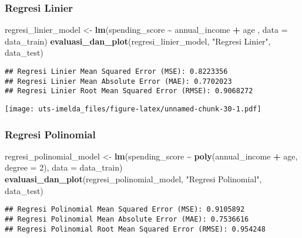 \documentclass[
]{article}
\newenvironment{Shaded}{\begin{snugshade}}{\end{snugshade}}
\newcommand{\AttributeTok}[1]{\textcolor[rgb]{0.13,0.29,0.53}{#1}}
\newcommand{\DecValTok}[1]{\textcolor[rgb]{0.00,0.00,0.81}{#1}}
\newcommand{\FunctionTok}[1]{\textcolor[rgb]{0.13,0.29,0.53}{\textbf{#1}}}
\newcommand{\NormalTok}[1]{#1}
\newcommand{\OtherTok}[1]{\textcolor[rgb]{0.56,0.35,0.01}{#1}}
\newcommand{\SpecialCharTok}[1]{\textcolor[rgb]{0.81,0.36,0.00}{\textbf{#1}}}
\newcommand{\StringTok}[1]{\textcolor[rgb]{0.31,0.60,0.02}{#1}}
\begin{document}
\hypertarget{regresi-linier}{%
\subsubsection{Regresi Linier}\label{regresi-linier}}

\begin{Shaded}
\begin{Highlighting}[]
\NormalTok{regresi\_linier\_model }\OtherTok{\textless{}{-}} \FunctionTok{lm}\NormalTok{(spending\_score }\SpecialCharTok{\textasciitilde{}}\NormalTok{ annual\_income }\SpecialCharTok{+}\NormalTok{ age , }\AttributeTok{data =}\NormalTok{ data\_train)}
\FunctionTok{evaluasi\_dan\_plot}\NormalTok{(regresi\_linier\_model, }\StringTok{"Regresi Linier"}\NormalTok{, data\_test)}
\end{Highlighting}
\end{Shaded}

\begin{verbatim}
## Regresi Linier Mean Squared Error (MSE): 0.8223356 
## Regresi Linier Mean Absolute Error (MAE): 0.7702023 
## Regresi Linier Root Mean Squared Error (RMSE): 0.9068272
\end{verbatim}

\texttt{[image: uts-imelda\_files/figure-latex/unnamed-chunk-30-1.pdf]}

\hypertarget{regresi-polinomial}{%
\subsubsection{Regresi Polinomial}\label{regresi-polinomial}}

\begin{Shaded}
\begin{Highlighting}[]
\NormalTok{regresi\_polinomial\_model }\OtherTok{\textless{}{-}} \FunctionTok{lm}\NormalTok{(spending\_score }\SpecialCharTok{\textasciitilde{}} \FunctionTok{poly}\NormalTok{(annual\_income }\SpecialCharTok{+}\NormalTok{ age, }\AttributeTok{degree =} \DecValTok{2}\NormalTok{), }\AttributeTok{data =}\NormalTok{ data\_train)}
\FunctionTok{evaluasi\_dan\_plot}\NormalTok{(regresi\_polinomial\_model, }\StringTok{"Regresi Polinomial"}\NormalTok{, data\_test)}
\end{Highlighting}
\end{Shaded}

\begin{verbatim}
## Regresi Polinomial Mean Squared Error (MSE): 0.9105892 
## Regresi Polinomial Mean Absolute Error (MAE): 0.7536616 
## Regresi Polinomial Root Mean Squared Error (RMSE): 0.954248
\end{verbatim}
\end{document}
